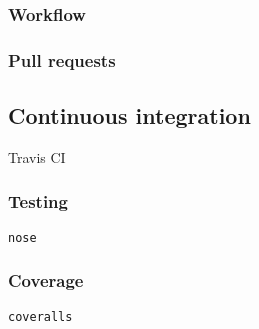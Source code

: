 \subsubsection{Workflow}

\subsubsection{Pull requests}


\subsection{Continuous integration}

Travis CI

\subsubsection{Testing}

\texttt{nose}

\subsubsection{Coverage}

\texttt{coveralls}
